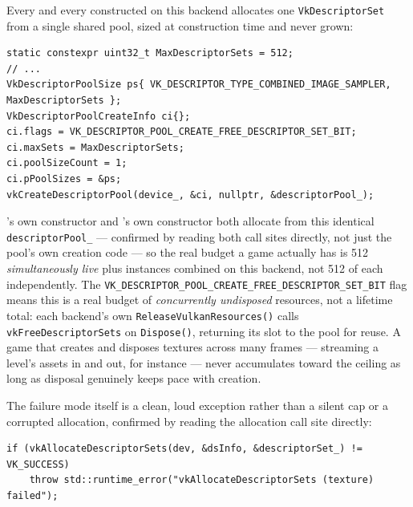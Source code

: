 Every  and every  constructed on this backend
allocates one \texttt{VkDescriptorSet} from a single shared pool, sized at construction time
and never grown:

\begin{lstlisting}
static constexpr uint32_t MaxDescriptorSets = 512;
// ...
VkDescriptorPoolSize ps{ VK_DESCRIPTOR_TYPE_COMBINED_IMAGE_SAMPLER, MaxDescriptorSets };
VkDescriptorPoolCreateInfo ci{};
ci.flags = VK_DESCRIPTOR_POOL_CREATE_FREE_DESCRIPTOR_SET_BIT;
ci.maxSets = MaxDescriptorSets;
ci.poolSizeCount = 1;
ci.pPoolSizes = &ps;
vkCreateDescriptorPool(device_, &ci, nullptr, &descriptorPool_);
\end{lstlisting}

's own constructor and 's
own constructor both allocate from this identical \texttt{descriptorPool\_} --- confirmed by
reading both call sites directly, not just the pool's own creation code --- so the real budget
a game actually has is 512 \emph{simultaneously live}  plus
 instances combined on this backend, not 512 of each independently.
The \texttt{VK\_DESCRIPTOR\_POOL\_CREATE\_FREE\_DESCRIPTOR\_SET\_BIT} flag means this is a real
budget of \emph{concurrently undisposed} resources, not a lifetime total: each backend's own
\texttt{ReleaseVulkanResources()} calls \texttt{vkFreeDescriptorSets} on \texttt{Dispose()},
returning its slot to the pool for reuse. A game that creates and disposes textures across many
frames --- streaming a level's assets in and out, for instance --- never accumulates toward the
ceiling as long as disposal genuinely keeps pace with creation.

The failure mode itself is a clean, loud exception rather than a silent cap or a corrupted
allocation, confirmed by reading the allocation call site directly:

\begin{lstlisting}
if (vkAllocateDescriptorSets(dev, &dsInfo, &descriptorSet_) != VK_SUCCESS)
    throw std::runtime_error("vkAllocateDescriptorSets (texture) failed");
\end{lstlisting}

